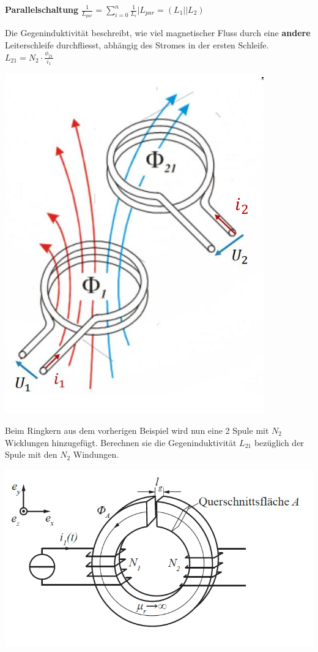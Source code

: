 		\textbf{Parallelschaltung}
		\formulaBegin
		$\displaystyle \frac{1}{L_{par}} = \sum_{i=0}^n \frac{1}{L_i} \Bigg\rvert L_{par} = (L_1 || L_2 )$
		\formulaEnd
	 \iend
\newpage


\beginip
Die Gegeninduktivität beschreibt, wie viel magnetischer Fluss durch eine \textbf{andere} Leiterschleife durchfliesst, abhängig
des Stromes in der ersten Schleife.
\formulaBegin
$\displaystyle L_{21} = N_2 \cdot \frac{\phi_{21}}{i_1}$
\formulaEnd
\begin{center}

	\includegraphics[scale=0.3]{img/gegenind}
\end{center}
\iend


\beginbsp
Beim Ringkern aus dem vorherigen Beispiel wird nun eine 2 Spule mit $N_2$ Wicklungen hinzugefügt. Berechnen sie die Gegeninduktivität $L_{21}$ bezüglich der Spule mit den $N_2$ Windungen.
\begin{center}

	\includegraphics[scale=0.5]{img/induktivitaet_bsp_2.png}
\end{center}
\iend

